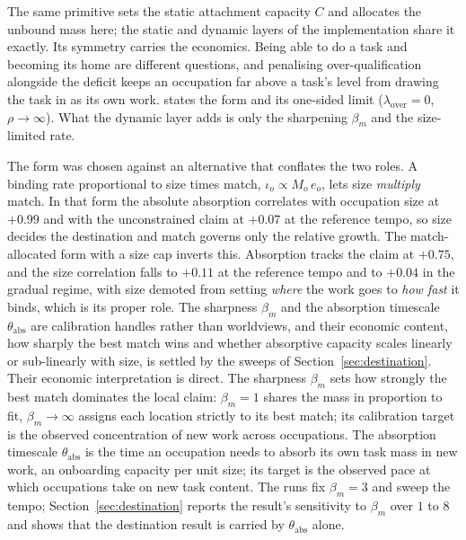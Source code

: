 \documentclass[12pt, a4paper]{article}
\begin{document}
The same primitive sets the static attachment capacity $C$ and allocates
the unbound mass here; the static and dynamic layers of the
implementation share it exactly. Its symmetry carries the economics.
Being able to do a task and becoming its home are different questions,
and penalising over-qualification alongside the deficit keeps an
occupation far above a task's level from drawing the task in as its own
work. \textcite{storck2026fields} states the form and its one-sided limit
($\lambda_{\mathrm{over}}=0$, $\rho\to\infty$). What the dynamic layer
adds is only the sharpening $\beta_m$ and the size-limited rate.

The form was chosen against an alternative that conflates the two roles.
A binding rate proportional to size times match, $\iota_o \propto
M_o\,e_o$, lets size \emph{multiply} match. In that form the
absolute absorption correlates with occupation size at $+0.99$ and with
the unconstrained claim at $+0.07$ at the reference tempo, so size
decides the destination and match governs only the relative growth. The
match-allocated form with a size cap inverts this. Absorption tracks
the claim at $+0.75$, and the size correlation falls to $+0.11$ at the
reference tempo and to $+0.04$ in the gradual regime, with size demoted
from setting \emph{where} the work goes to \emph{how fast} it binds,
which is its proper role. The sharpness $\beta_m$ and the absorption
timescale $\theta_{\text{abs}}$ are calibration handles rather than
worldviews, and their economic content, how sharply the best match wins
and whether absorptive capacity scales linearly or sub-linearly with
size, is settled by the sweeps of Section~\ref{sec:destination}.
Their economic interpretation is direct. The sharpness $\beta_m$ sets how
strongly the best match dominates the local claim: $\beta_m = 1$ shares
the mass in proportion to fit, $\beta_m \to \infty$ assigns each location
strictly to its best match; its calibration target is the observed
concentration of new work across occupations. The absorption timescale
$\theta_{\text{abs}}$ is the time an occupation needs to absorb its own
task mass in new work, an onboarding capacity per unit size; its target
is the observed pace at which occupations take on new task content. The
runs fix $\beta_m = 3$ and sweep the tempo;
Section~\ref{sec:destination} reports the result's sensitivity to
$\beta_m$ over $1$ to $8$ and shows that the destination result is
carried by $\theta_{\text{abs}}$ alone.
\end{document}
